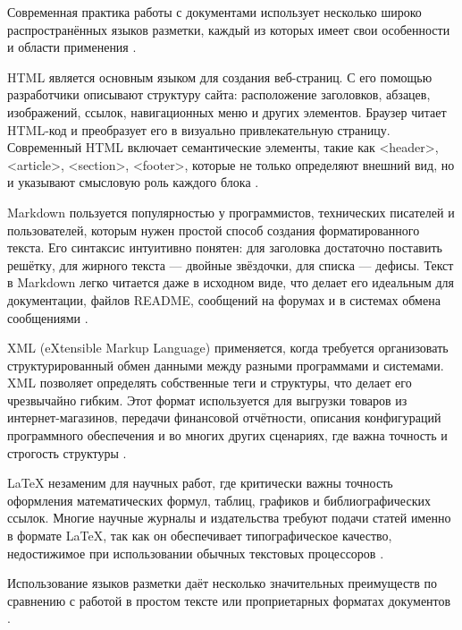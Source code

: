 \documentclass{SibFU-docs}
\begin{document}

Современная практика работы с документами использует несколько широко распространённых языков разметки, каждый из которых имеет свои особенности и области применения \cite{markdown_spec, latex_project}.

HTML является основным языком для создания веб-страниц. С его помощью разработчики описывают структуру сайта: расположение заголовков, абзацев, изображений, ссылок, навигационных меню и других элементов. Браузер читает HTML-код и преобразует его в визуально привлекательную страницу. Современный HTML включает семантические элементы, такие как <header>, <article>, <section>, <footer>, которые не только определяют внешний вид, но и указывают смысловую роль каждого блока \cite{w3c_html}.

Markdown пользуется популярностью у программистов, технических писателей и пользователей, которым нужен простой способ создания форматированного текста. Его синтаксис интуитивно понятен: для заголовка достаточно поставить решётку, для жирного текста — двойные звёздочки, для списка — дефисы. Текст в Markdown легко читается даже в исходном виде, что делает его идеальным для документации, файлов README, сообщений на форумах и в системах обмена сообщениями \cite{markdown_spec}.

XML (eXtensible Markup Language) применяется, когда требуется организовать структурированный обмен данными между разными программами и системами. XML позволяет определять собственные теги и структуры, что делает его чрезвычайно гибким. Этот формат используется для выгрузки товаров из интернет-магазинов, передачи финансовой отчётности, описания конфигураций программного обеспечения и во многих других сценариях, где важна точность и строгость структуры \cite{xml_w3c}.

LaTeX незаменим для научных работ, где критически важны точность оформления математических формул, таблиц, графиков и библиографических ссылок. Многие научные журналы и издательства требуют подачи статей именно в формате LaTeX, так как он обеспечивает типографическое качество, недостижимое при использовании обычных текстовых процессоров \cite{knuth1984texbook, latex_project}.


Использование языков разметки даёт несколько значительных преимуществ по сравнению с работой в простом тексте или проприетарных форматах документов \cite{grune2012markup, markdown_yaml}.
\end{document}
